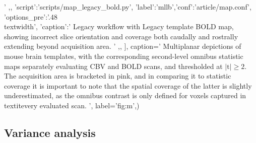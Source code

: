 {{                                '
			,},
		{'script':'scripts/map_legacy_bold.py', 'label':'mllb','conf':'article/map.conf', 'options_pre':'{.48\\textwidth}',
			'caption':'
				Legacy workflow with Legacy template BOLD map, showing incorrect slice orientation and coverage both caudally and rostrally extending beyond acquisition area.
			        '
                        ,},
		],
	caption='
                Multiplanar depictions of mouse brain templates, with the corresponding second-level omnibus statistic maps separately evaluating CBV and BOLD scans, and thresholded at $\mathrm{|t|\geq2}$.
                The acquisition area is bracketed in pink, and in comparing it to statistic coverage it is important to note that the spatial coverage of the latter is slightly underestimated, as the omnibus contrast is only defined for voxels captured in \\textit{every} evaluated scan.
                ',
	label='fig:m',)}

\clearpage

\subsection{Variance analysis}

\begin{sansmath}
\end{sansmath}

